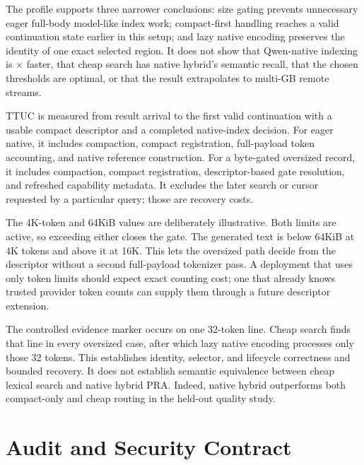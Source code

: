 \documentclass[11pt]{article}
\begin{document}
The profile supports three narrower conclusions: size gating prevents
unnecessary eager full-body model-like index work; compact-first handling
reaches a valid continuation state earlier in this setup; and lazy native
encoding preserves the identity of one exact selected region. It does not show
that Qwen-native indexing is \PaperSevenTTUCReduction{}$\times$ faster, that
cheap search has native hybrid's semantic recall, that the chosen thresholds
are optimal, or that the result extrapolates to multi-GB remote streams.

TTUC is measured from result arrival to the first valid continuation with a
usable compact descriptor and a completed native-index decision. For eager
native, it includes compaction, compact registration, full-payload token
accounting, and native reference construction. For a byte-gated oversized
record, it includes compaction, compact registration, descriptor-based gate
resolution, and refreshed capability metadata. It excludes the later search or
cursor requested by a particular query; those are recovery costs.

The 4K-token and 64KiB values are deliberately illustrative. Both limits are
active, so exceeding either closes the gate. The generated text is below 64KiB
at 4K tokens and above it at 16K. This lets the oversized path decide from the
descriptor without a second full-payload tokenizer pass. A deployment that
uses only token limits should expect exact counting cost; one that already
knows trusted provider token counts can supply them through a future descriptor
extension.

The controlled evidence marker occurs on one 32-token line. Cheap search finds
that line in every oversized case, after which lazy native encoding processes
only those 32 tokens. This establishes identity, selector, and lifecycle
correctness and bounded recovery. It does not establish semantic equivalence
between cheap lexical search and native hybrid PRA. Indeed, native hybrid
outperforms both compact-only and cheap routing in the held-out quality study.

\section{Audit and Security Contract}
\end{document}
